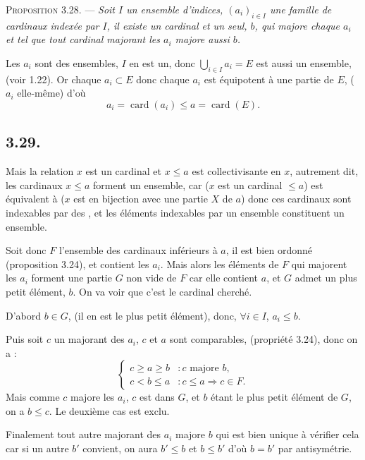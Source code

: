 \medskip\noindent\textsc{Proposition 3.28.} --- \emph{Soit $I$ un ensemble d'indices, $(a_i)_{i\in I}$ une famille de cardinaux indexée par $I$, il existe un cardinal et un seul, $b$, qui majore chaque $a_i$ et tel que tout cardinal majorant les $a_i$ majore aussi $b$.}

Les $a_i$ sont des ensembles, $I$ en est un, donc $\bigcup_{i\in I}a_i=E$ est aussi un ensemble, (voir 1.22). Or chaque $a_i\subset E$ donc chaque $a_i$ est équipotent à une partie de $E$, ($a_i$ elle-même) d'où
\[
a_i=\operatorname{card}(a_i)\le a=\operatorname{card}(E).
\]

\subsection*{3.29.}
Mais la relation $x$ est un cardinal et $x\le a$ est collectivisante en $x$, autrement dit, les cardinaux $x\le a$ forment un ensemble, car ($x$ est un cardinal $\le a$) est équivalent à ($x$ est en bijection avec une partie $X$ de $a$) donc ces cardinaux sont indexables par des , et les éléments indexables par un ensemble constituent un ensemble.

Soit donc $F$ l'ensemble des cardinaux inférieurs à $a$, il est bien ordonné (proposition 3.24), et contient les $a_i$. Mais alors les éléments de $F$ qui majorent les $a_i$ forment une partie $G$ non vide de $F$ car elle contient $a$, et $G$ admet un plus petit élément, $b$. On va voir que c'est le cardinal cherché.

D'abord $b\in G$, (il en est le plus petit élément), donc, $\forall i\in I$, $a_i\le b$.

Puis soit $c$ un majorant des $a_i$, $c$ et $a$ sont comparables, (propriété 3.24), donc on a :
\[
\begin{cases}
 c\ge a\ge b &: c\text{ majore }b,\\
 c<b\le a &: c\le a\Rightarrow c\in F.
\end{cases}
\]
Mais comme $c$ majore les $a_i$, $c$ est dans $G$, et $b$ étant le plus petit élément de $G$, on a $b\le c$. Le deuxième cas est exclu.

Finalement tout autre majorant des $a_i$ majore $b$ qui est bien unique à vérifier cela car si un autre $b'$ convient, on aura $b'\le b$ et $b\le b'$ d'où $b=b'$ par antisymétrie. \bookend

